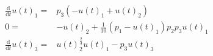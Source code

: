 \begin{align}
\frac{\mathrm{d}}{\mathrm{d}t} u(t)_1 =& p_3 \left(  - u(t)_1 + u(t)_2 \right) \\
0 =&  - u(t)_2 + \frac{1}{10} \left( p_1 - u(t)_1 \right) p_2 p_3 u(t)_1 \\
\frac{\mathrm{d}}{\mathrm{d}t} u(t)_3 =& u(t)_2^{\frac{2}{3}} u(t)_1 - p_3 u(t)_3
\end{align}
